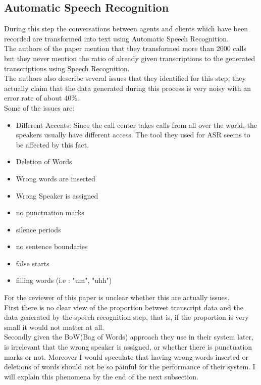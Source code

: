 \documentclass[4pt,a4paper,twocolumn]{article}
\begin{document}
\subsection{Automatic Speech Recognition}
		
During this step the conversations between agents and clients which have been recorded are transformed into text using Automatic Speech Recognition.\\
The authors of the paper mention that they transformed more than 2000 calls  but they never mention the ratio of already given transcriptions to the generated transcriptions using Speech Recognition.\\
The authors also describe several issues that they identified for this step, they actually claim that the data generated during this process is very noisy with an error rate of about 40\%.\\
Some of the issues are:
\begin{itemize}

	\item Different Accents: Since the call center takes calls from all over the world, the speakers usually have different access. The tool they used for ASR seems to be affected by this fact.
	
	\item Deletion of Words 
	
	\item Wrong words are inserted
	
	\item Wrong Speaker is assigned
	
	\item no punctuation marks
	
	\item silence periods
	
	\item no sentence boundaries
	
	\item false starts
	
	\item filling words (i.e : "um", "uhh")
\end{itemize}

For the reviewer of this paper is unclear whether this are actually issues.\\
First there is no clear view of the proportion betweet transcript data and the data generated by the speech recognition step, that is, if the proportion is very small it would not matter at all.\\
Secondly given the BoW(Bag of Words) approach they use in their system later, is irrelevant that the wrong speaker is assigned, or whether there is punctuation marks or not. Moreover I would speculate that having wrong words inserted or deletions of words should not be so painful for the performance of their system. I will explain this phenomena by the end of the next subsection.
\end{document}
